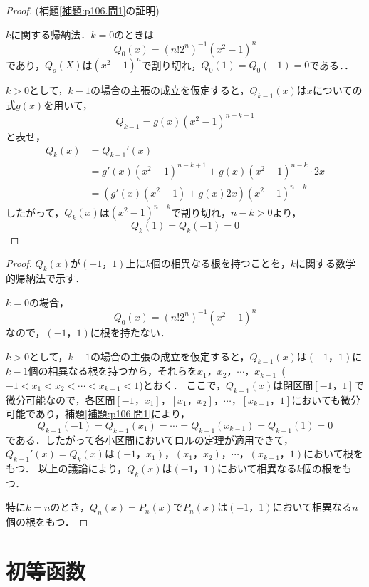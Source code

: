 \documentclass[dvipdfmx,uplatex,11pt]{jsarticle}
\theoremstyle{definition}
\begin{document}
\begin{proof}(補題\ref{補題:p106.問1}の証明)\par 
    $k$に関する帰納法．$k=0$のときは
    \[
        Q_0(x)= (n! 2^n)^{-1} (x^2-1)^n
    \]
    であり，$Q_o(X)$は$(x^2-1)^n$で割り切れ，$Q_0(1)=Q_0(-1)=0$である．．\par 
    $k>0$として，$k-1$の場合の主張の成立を仮定すると，$Q_{k-1}(x)$は$x$についての式$g(x)$を用いて，
    \[
        Q_{k-1} = g(x)(x^2-1)^{n-k+1}
    \]
    と表せ，
    \begin{align*}
        Q_k (x) & =Q_{k-1}' (x) \\
        &= g'(x)(x^2-1)^{n-k+1} + g(x) (x^2-1)^{n-k} \cdot 2x \\
        &=(g'(x)(x^2-1)+g(x)2x) (x^2-1)^{n-k}
    \end{align*}
    したがって，$Q_k(x)$は$(x^2-1)^{n-k}$で割り切れ，$n-k >0$より，
    \[
        Q_k (1)= Q_k(-1)=0
    \]
\end{proof}

\begin{leftbar}
    \begin{proof}
        $Q_k (x)$が$(-1，1)$上に$k$個の相異なる根を持つことを，$k$に関する数学的帰納法で示す．\par 
        $k=0$の場合，
        \[
            Q_0(x)= (n! 2^n)^{-1} (x^2-1)^n
        \]
        なので，$(-1，1)$に根を持たない．\par 
        $k>0$として，$k-1$の場合の主張の成立を仮定すると，$Q_{k-1}(x)$は$(-1，1)$に$k-1$個の相異なる根を持つから，それらを$x_1，x_2，\cdots，x_{k-1}$~($-1<x_1<x_2<\cdots <x_{k-1}<1$)とおく．
        ここで，$Q_{k-1} (x)$は閉区間$[-1，1]$で微分可能なので，各区間$[-1，x_1]，[x_1，x_2]，\cdots，[x_{k-1}，1]$においても微分可能であり，補題\ref{補題:p106.問1}により，
        \[
            Q_{k-1} (-1) = Q_{k-1}(x_1)=\cdots = Q_{k-1}(x_{k-1})=Q_{k-1}(1)=0
        \]
        である．したがって各小区間においてロルの定理が適用できて，$Q_{k-1}' (x)=Q_k(x)$は$(-1，x_1)，(x_1，x_2)，\cdots ，(x_{k-1}，1)$において根をもつ．
        以上の議論により，$Q_k (x)$は$(-1，1)$において相異なる$k$個の根をもつ．\par 
        特に$k=n$のとき，$Q_n (x)=P_n(x)$で$P_n (x)$は$(-1，1)$において相異なる$n$個の根をもつ．
    \end{proof}
\end{leftbar}

\newpage

\section{初等函数}
\end{document}
